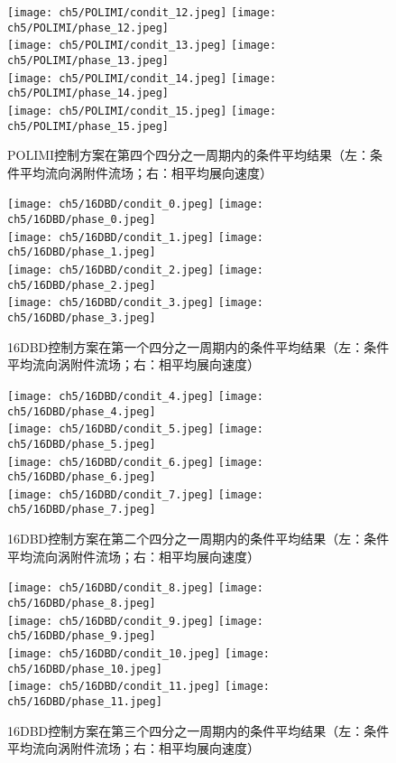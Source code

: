 \begin{figure}[htb]
  \centering
  \texttt{[image: ch5/POLIMI/condit\_12.jpeg]}
  \texttt{[image: ch5/POLIMI/phase\_12.jpeg]}\\
  \texttt{[image: ch5/POLIMI/condit\_13.jpeg]}
  \texttt{[image: ch5/POLIMI/phase\_13.jpeg]}\\
  \texttt{[image: ch5/POLIMI/condit\_14.jpeg]}
  \texttt{[image: ch5/POLIMI/phase\_14.jpeg]}\\
  \texttt{[image: ch5/POLIMI/condit\_15.jpeg]}
  \texttt{[image: ch5/POLIMI/phase\_15.jpeg]}
  \caption{POLIMI控制方案在第四个四分之一周期内的条件平均结果（左：条件平均流向涡附件流场；右：相平均展向速度）}\label{f:polimi_conditionally4}
\end{figure}
\begin{figure}[htb]
  \centering
  \texttt{[image: ch5/16DBD/condit\_0.jpeg]}
  \texttt{[image: ch5/16DBD/phase\_0.jpeg]}\\
  \texttt{[image: ch5/16DBD/condit\_1.jpeg]}
  \texttt{[image: ch5/16DBD/phase\_1.jpeg]}\\
  \texttt{[image: ch5/16DBD/condit\_2.jpeg]}
  \texttt{[image: ch5/16DBD/phase\_2.jpeg]}\\
  \texttt{[image: ch5/16DBD/condit\_3.jpeg]}
  \texttt{[image: ch5/16DBD/phase\_3.jpeg]}
  \caption{16DBD控制方案在第一个四分之一周期内的条件平均结果（左：条件平均流向涡附件流场；右：相平均展向速度）}\label{f:16DBD_conditional_1}
\end{figure}
\begin{figure}[htb]
  \centering
  \texttt{[image: ch5/16DBD/condit\_4.jpeg]}
  \texttt{[image: ch5/16DBD/phase\_4.jpeg]}\\
  \texttt{[image: ch5/16DBD/condit\_5.jpeg]}
  \texttt{[image: ch5/16DBD/phase\_5.jpeg]}\\
  \texttt{[image: ch5/16DBD/condit\_6.jpeg]}
  \texttt{[image: ch5/16DBD/phase\_6.jpeg]}\\
  \texttt{[image: ch5/16DBD/condit\_7.jpeg]}
  \texttt{[image: ch5/16DBD/phase\_7.jpeg]}
  \caption{16DBD控制方案在第二个四分之一周期内的条件平均结果（左：条件平均流向涡附件流场；右：相平均展向速度）}\label{f:16DBD_conditional_2}
\end{figure}
\begin{figure}[htb]
  \centering
  \texttt{[image: ch5/16DBD/condit\_8.jpeg]}
  \texttt{[image: ch5/16DBD/phase\_8.jpeg]}\\
  \texttt{[image: ch5/16DBD/condit\_9.jpeg]}
  \texttt{[image: ch5/16DBD/phase\_9.jpeg]}\\
  \texttt{[image: ch5/16DBD/condit\_10.jpeg]}
  \texttt{[image: ch5/16DBD/phase\_10.jpeg]}\\
  \texttt{[image: ch5/16DBD/condit\_11.jpeg]}
  \texttt{[image: ch5/16DBD/phase\_11.jpeg]}
  \caption{16DBD控制方案在第三个四分之一周期内的条件平均结果（左：条件平均流向涡附件流场；右：相平均展向速度）}\label{f:16DBD_conditional_3}
\end{figure}
